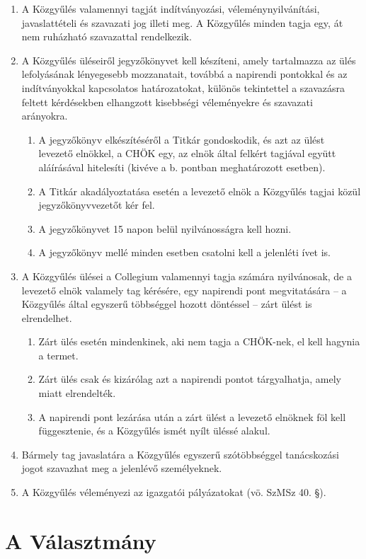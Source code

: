 \documentclass{../styles/rulebook}
\begin{document}
\begin{enumerate}
	\item A Közgyűlés valamennyi tagját indítványozási, véleménynyilvánítási, javaslattételi és szavazati jog illeti meg. A Közgyűlés minden tagja egy, át nem ruházható szavazattal rendelkezik.
	\item A Közgyűlés üléseiről jegyzőkönyvet kell készíteni, amely tartalmazza az ülés lefolyásának lényegesebb mozzanatait, továbbá a napirendi pontokkal és az indítványokkal kapcsolatos határozatokat, különös tekintettel a szavazásra feltett kérdésekben elhangzott kisebbségi véleményekre és szavazati arányokra.
	\begin{enumerate}
		\item A jegyzőkönyv elkészítéséről a Titkár gondoskodik, és azt az ülést levezető elnökkel, a CHÖK egy, az elnök által felkért tagjával együtt aláírásával hitelesíti (kivéve a b. pontban meghatározott esetben).
		\item A Titkár akadályoztatása esetén a levezető elnök a Közgyűlés tagjai közül jegyzőkönyvvezetőt kér fel.
		\item A jegyzőkönyvet 15 napon belül nyilvánosságra kell hozni.
		\item A jegyzőkönyv mellé minden esetben csatolni kell a jelenléti ívet is.
	\end{enumerate}
	\item A Közgyűlés ülései a Collegium valamennyi tagja számára nyilvánosak, de a levezető elnök valamely tag kérésére, egy napirendi pont megvitatására – a Közgyűlés által egyszerű többséggel hozott döntéssel – zárt ülést is elrendelhet.
	\begin{enumerate}
		\item Zárt ülés esetén mindenkinek, aki nem tagja a CHÖK-nek, el kell hagynia a termet.
		\item Zárt ülés csak és kizárólag azt a napirendi pontot tárgyalhatja, amely miatt elrendelték.
		\item A napirendi pont lezárása után a zárt ülést a levezető elnöknek föl kell függesztenie, és a Közgyűlés ismét nyílt üléssé alakul.
	\end{enumerate}
	\item Bármely tag javaslatára a Közgyűlés egyszerű szótöbbséggel tanácskozási jogot szavazhat meg a jelenlévő személyeknek.
	\item A Közgyűlés véleményezi az igazgatói pályázatokat (vö. SzMSz 40. §).
\end{enumerate}


\section{A Választmány}
\end{document}
